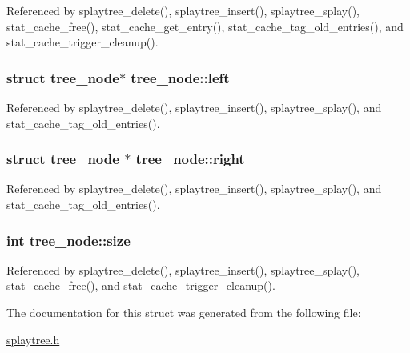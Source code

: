 Referenced by splaytree\-\_\-delete(), splaytree\-\_\-insert(), splaytree\-\_\-splay(), stat\-\_\-cache\-\_\-free(), stat\-\_\-cache\-\_\-get\-\_\-entry(), stat\-\_\-cache\-\_\-tag\-\_\-old\-\_\-entries(), and stat\-\_\-cache\-\_\-trigger\-\_\-cleanup().

\hypertarget{structtree__node_a3e30a7ba2a4e3286ec7394ba920f2893}{
\subsubsection[{left}]{\setlength{\rightskip}{0pt plus 5cm}struct {\bf tree\-\_\-node}$\ast$ tree\-\_\-node\-::left}}\label{structtree__node_a3e30a7ba2a4e3286ec7394ba920f2893}


Referenced by splaytree\-\_\-delete(), splaytree\-\_\-insert(), splaytree\-\_\-splay(), and stat\-\_\-cache\-\_\-tag\-\_\-old\-\_\-entries().

\hypertarget{structtree__node_a2f0787899c2e8825c8b1a2c4f55a3804}{
\subsubsection[{right}]{\setlength{\rightskip}{0pt plus 5cm}struct {\bf tree\-\_\-node} $\ast$ tree\-\_\-node\-::right}}\label{structtree__node_a2f0787899c2e8825c8b1a2c4f55a3804}


Referenced by splaytree\-\_\-delete(), splaytree\-\_\-insert(), splaytree\-\_\-splay(), and stat\-\_\-cache\-\_\-tag\-\_\-old\-\_\-entries().

\hypertarget{structtree__node_a4fe936bc675ebeb78a22971379257c77}{
\subsubsection[{size}]{\setlength{\rightskip}{0pt plus 5cm}int tree\-\_\-node\-::size}}\label{structtree__node_a4fe936bc675ebeb78a22971379257c77}


Referenced by splaytree\-\_\-delete(), splaytree\-\_\-insert(), splaytree\-\_\-splay(), stat\-\_\-cache\-\_\-free(), and stat\-\_\-cache\-\_\-trigger\-\_\-cleanup().



The documentation for this struct was generated from the following file\-:\begin{DoxyCompactItemize}
\item 
\hyperlink{splaytree_8h}{splaytree.\-h}\end{DoxyCompactItemize}
